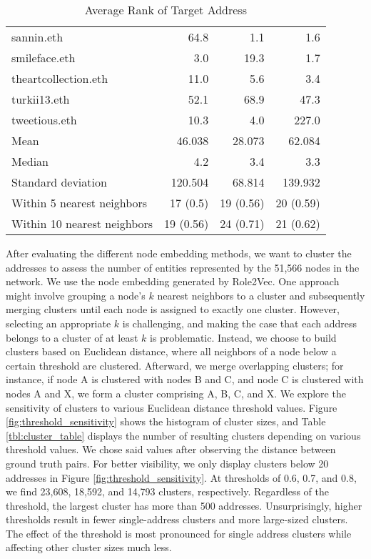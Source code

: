 \documentclass[12pt,a4paper,titlepage,oneside,english]{article}
\begin{document}
\begin{table}[h!]
\begin{tabular}{lrrr}
	sannin.eth & 64.8 & 1.1 & 1.6 \\
	smileface.eth & 3.0 & 19.3 & 1.7 \\
	theartcollection.eth & 11.0 & 5.6 & 3.4 \\
	turkii13.eth & 52.1 & 68.9 & 47.3 \\
	tweetious.eth & 10.3 & 4.0 & 227.0 \\
    \hline
    Mean & 46.038 & 28.073 & 62.084 \\
    Median & 4.2 & 3.4 & 3.3 \\
    Standard deviation & 120.504 & 68.814 &  139.932\\
    Within 5 nearest neighbors & 17 (0.5) & 19 (0.56) & 20 (0.59) \\
    Within 10 nearest neighbors & 19 (0.56) & 24 (0.71) & 21 (0.62)\\
    \hline
  \end{tabular}
  \caption{Average Rank of Target Address}
  \label{tbl:ENS_Domain_Ranks}
\end{table}

After evaluating the different node embedding methods, we want to cluster the addresses to assess the number of entities represented by the 51,566 nodes in the network. We use the node embedding generated by Role2Vec. \newline
One approach might involve grouping a node's $k$ nearest neighbors to a cluster and subsequently merging clusters until each node is assigned to exactly one cluster. However, selecting an appropriate $k$ is challenging, and making the case that each address belongs to a cluster of at least $k$ is problematic. \newline
Instead, we choose to build clusters based on Euclidean distance, where all neighbors of a node below a certain threshold are clustered. Afterward, we merge overlapping clusters; for instance, if node A is clustered with nodes B and C, and node C is clustered with nodes A and X, we form a cluster comprising A, B, C, and X. \newline
We explore the sensitivity of clusters to various Euclidean distance threshold values. Figure \ref{fig:threshold_sensitivity} shows the histogram of cluster sizes, and Table \ref{tbl:cluster_table} displays the number of resulting clusters depending on various threshold values. We chose said values after observing the distance between ground truth pairs. For better visibility, we only display clusters below 20 addresses in Figure \ref{fig:threshold_sensitivity}. At thresholds of 0.6, 0.7, and 0.8, we find 23,608, 18,592, and 14,793 clusters, respectively. Regardless of the threshold, the largest cluster has more than 500 addresses. Unsurprisingly, higher thresholds result in fewer single-address clusters and more large-sized clusters. The effect of the threshold is most pronounced for single address clusters while affecting other cluster sizes much less. 
\end{document}
